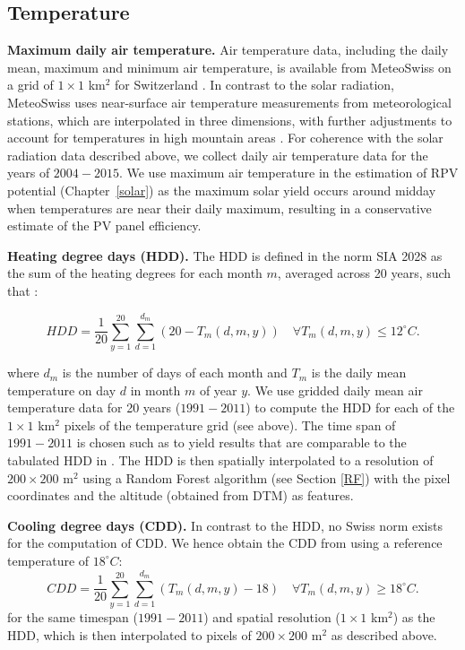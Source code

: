 \subsection{Temperature}

\textbf{Maximum daily air temperature.} Air temperature data, including the daily mean, maximum and minimum air temperature, is available from MeteoSwiss on a grid of $1 \times 1$ km$^2$ for Switzerland \cite{meteoswiss_daily_2017}. 
In contrast to the solar radiation, MeteoSwiss uses near-surface air temperature measurements from meteorological stations, which are interpolated in three dimensions, with further adjustments to account for temperatures in high mountain areas \cite{meteoswiss_daily_2017}.
For coherence with the solar radiation data described above, we collect daily air temperature data for the years of $2004-2015$. 
We use maximum air temperature in the estimation of RPV potential (Chapter~\ref{solar}) as the maximum solar yield occurs around midday when temperatures are near their daily maximum, resulting in a conservative estimate of the PV panel efficiency.

\textbf{Heating degree days (HDD).}
\label{app:HDD}
The HDD is defined in the norm SIA 2028 as the sum of the heating degrees for each month $m$, averaged across 20 years, such that \cite{sia_klimadaten_2010}: 

\begin{equation}
\label{eq:hdd}
    HDD = \frac{1}{20} \sum_{y=1}^{20} \sum_{d=1}^{d_m} (20 - T_{m}(d, m, y)) \quad \forall T_{m} (d, m, y) \leq 12 ^\circ C. 
\end{equation}

where $d_m$ is the number of days of each month and $T_{m}$ is the daily mean temperature on day $d$ in month $m$ of year $y$. 
We use gridded daily mean air temperature data for 20 years ($1991-2011$) \cite{meteoswiss_daily_2017} to compute the HDD for each of the $1 \times 1$  km$^2$ pixels of the temperature grid (see above). The time span of  $1991-2011$ is chosen such as to yield results that are comparable to the tabulated HDD in \cite{sia_klimadaten_2010}.
The HDD is then spatially interpolated to a resolution of $200 \times 200$ m$^2$ using a Random Forest algorithm (see Section \ref{RF}) with the pixel coordinates and the altitude (obtained from DTM) as features.

\textbf{Cooling degree days (CDD).} In contrast to the HDD, no Swiss norm exists for the computation of CDD. We hence obtain the CDD from \cite{christenson_climate_2006} using a reference temperature of $18 ^\circ C$:
\begin{equation}
\label{eq:cdd}
    CDD = \frac{1}{20} \sum_{y=1}^{20} \sum_{d=1}^{d_m} (T_{m}(d, m, y)-18) \quad \forall T_{m} (d, m, y) \geq 18 ^\circ C. 
\end{equation}
for the same timespan ($1991-2011$) and spatial resolution ($1 \times 1$ km$^2$) as the HDD, which is then interpolated to pixels of $200 \times 200$ m$^2$ as described above.

